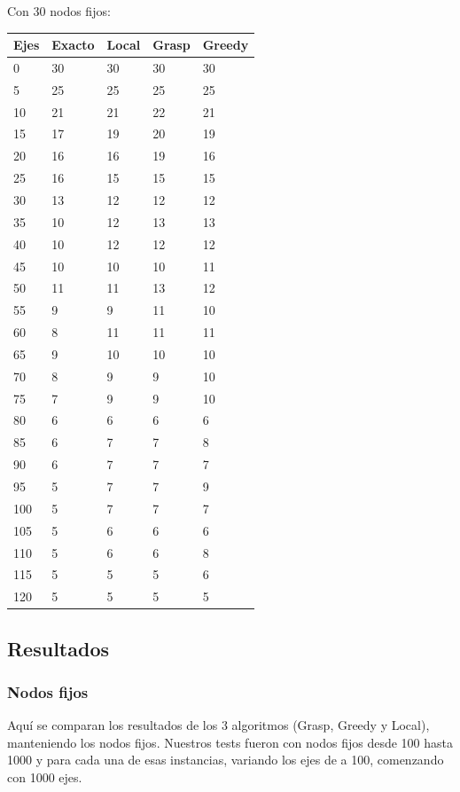 Con 30 nodos fijos:
\begin{tabular}{| l | l | l | l | l |}
 \hline
Ejes&Exacto&Local&Grasp&Greedy \\ \hline
0&30&30&30&30 \\ \hline
5&25&25&25&25 \\ \hline
10&21&21&22&21 \\ \hline
15&17&19&20&19 \\ \hline
20&16&16&19&16 \\ \hline
25&16&15&15&15 \\ \hline
30&13&12&12&12 \\ \hline
35&10&12&13&13 \\ \hline
40&10&12&12&12 \\ \hline
45&10&10&10&11 \\ \hline
50&11&11&13&12 \\ \hline
55&9&9&11&10 \\ \hline
60&8&11&11&11 \\ \hline
65&9&10&10&10 \\ \hline
70&8&9&9&10 \\ \hline
75&7&9&9&10 \\ \hline
80&6&6&6&6 \\ \hline
85&6&7&7&8 \\ \hline
90&6&7&7&7 \\ \hline
95&5&7&7&9 \\ \hline
100&5&7&7&7 \\ \hline
105&5&6&6&6 \\ \hline
110&5&6&6&8 \\ \hline
115&5&5&5&6 \\ \hline
120&5&5&5&5 \\ \hline
\end{tabular}





\subsection{Resultados}
\subsubsection{Nodos fijos}
Aqu\'i se comparan los resultados de los 3 algoritmos (Grasp, Greedy y Local), manteniendo los nodos fijos. Nuestros tests fueron con nodos fijos desde 100 hasta 1000 y para cada una de esas instancias,
variando los ejes de a 100, comenzando con 1000 ejes.\\

